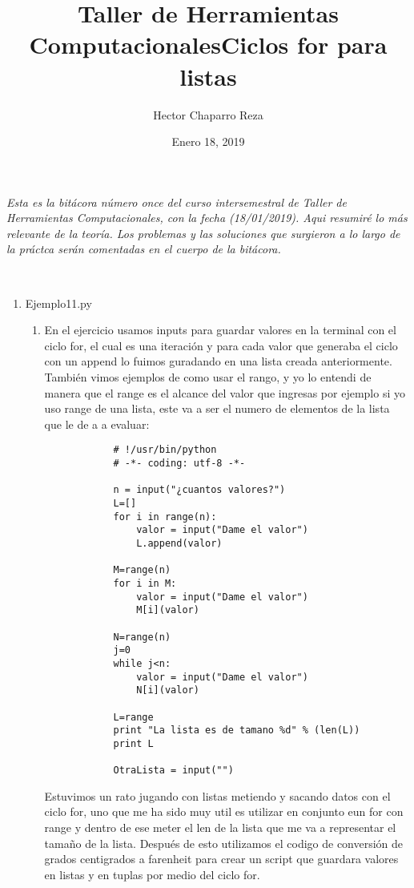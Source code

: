 \documentclass[letterpaper, 12pt, oneside]{article}
\title{\Huge{Taller de Herramientas Computacionales}}
\author{Hector Chaparro Reza}
\date{Enero 18, 2019}
\begin{document}
	\maketitle
	\it Esta es la bit\'acora número once del curso intersemestral de Taller de Herramientas Computacionales, con la fecha (18/01/2019). Aqui resumir\'e lo m\'as relevante de la teor\'ia. Los problemas y las soluciones que surgieron a lo largo de la pr\'actca ser\'an comentadas en el cuerpo de la bit\'acora.\\
	\newpage
	
	
	\title{\Huge{Ciclos for para listas}}\\
	
	\begin{enumerate}
		\item {Ejemplo11.py}
		\begin{enumerate}
			\item En el ejercicio usamos inputs para guardar valores en la terminal con el ciclo for, el cual es una iteración y para cada valor que generaba el ciclo con un append lo fuimos guradando en una lista creada anteriormente. También vimos ejemplos de como usar el rango, y yo lo entendi de manera que el range es el alcance del valor que ingresas por ejemplo si yo uso range de una lista, este va a ser el numero de elementos de la lista que le de a a evaluar:\\
			
			\begin{verbatim}
			# !/usr/bin/python
			# -*- coding: utf-8 -*-
			
			n = input("¿cuantos valores?")
			L=[]
			for i in range(n):
				valor = input("Dame el valor")
				L.append(valor)
			
			M=range(n)
			for i in M:
				valor = input("Dame el valor")
				M[i](valor)
			
			N=range(n)
			j=0
			while j<n:
				valor = input("Dame el valor")
				N[i](valor)
			
			L=range
			print "La lista es de tamano %d" % (len(L))
			print L
			
			OtraLista = input("")
			\end{verbatim}
			
			Estuvimos un rato jugando con listas metiendo y sacando datos con el ciclo for, uno que me ha sido muy util es utilizar en conjunto eun for con range y dentro de ese meter el len de la lista que me va a representar el tamaño de la lista. Después de esto utilizamos el codigo de conversión de grados centigrados a farenheit para crear un script que guardara valores en listas y en tuplas por medio del ciclo for.
			

\end{enumerate}
\end{enumerate}
\end{document}
